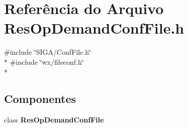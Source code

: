 \section{Referência do Arquivo Res\+Op\+Demand\+Conf\+File.\+h}
\label{_res_op_demand_conf_file_8h}
{\ttfamily \#include \char`\"{}S\+I\+G\+A/\+Conf\+File.\+h\char`\"{}}\\*
{\ttfamily \#include \char`\"{}wx/fileconf.\+h\char`\"{}}\\*
\subsection*{Componentes}
\begin{DoxyCompactItemize}
\item 
class {\bf Res\+Op\+Demand\+Conf\+File}
\end{DoxyCompactItemize}
